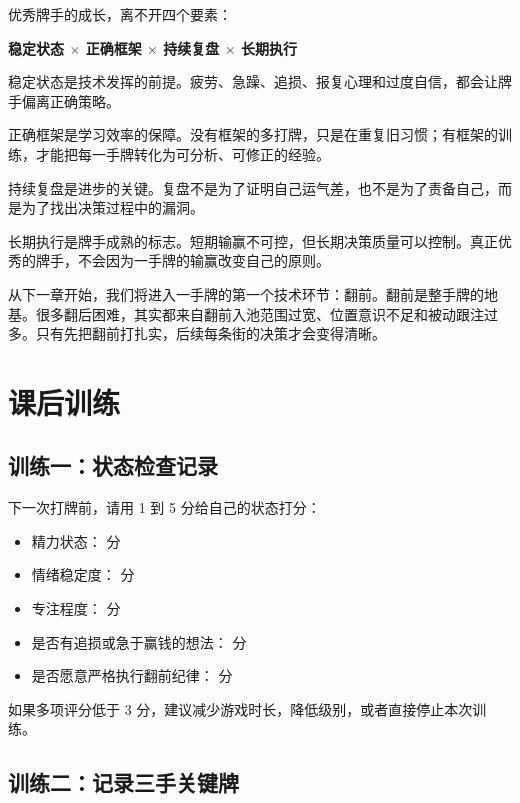 优秀牌手的成长，离不开四个要素：

\begin{center}
\textbf{稳定状态 $\times$ 正确框架 $\times$ 持续复盘 $\times$ 长期执行}
\end{center}

稳定状态是技术发挥的前提。疲劳、急躁、追损、报复心理和过度自信，都会让牌手偏离正确策略。

正确框架是学习效率的保障。没有框架的多打牌，只是在重复旧习惯；有框架的训练，才能把每一手牌转化为可分析、可修正的经验。

持续复盘是进步的关键。复盘不是为了证明自己运气差，也不是为了责备自己，而是为了找出决策过程中的漏洞。

长期执行是牌手成熟的标志。短期输赢不可控，但长期决策质量可以控制。真正优秀的牌手，不会因为一手牌的输赢改变自己的原则。

从下一章开始，我们将进入一手牌的第一个技术环节：翻前。翻前是整手牌的地基。很多翻后困难，其实都来自翻前入池范围过宽、位置意识不足和被动跟注过多。只有先把翻前打扎实，后续每条街的决策才会变得清晰。

\section{课后训练}

\subsection*{训练一：状态检查记录}

下一次打牌前，请用 1 到 5 分给自己的状态打分：

\begin{itemize}
\item 精力状态：\underline{\hspace{2cm}} 分
\item 情绪稳定度：\underline{\hspace{2cm}} 分
\item 专注程度：\underline{\hspace{2cm}} 分
\item 是否有追损或急于赢钱的想法：\underline{\hspace{2cm}} 分
\item 是否愿意严格执行翻前纪律：\underline{\hspace{2cm}} 分
\end{itemize}

如果多项评分低于 3 分，建议减少游戏时长，降低级别，或者直接停止本次训练。

\subsection*{训练二：记录三手关键牌}

